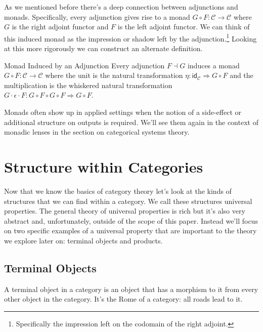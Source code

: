 \documentclass[12pt]{article}
\newcounter{examp}
\begin{document}
As we mentioned before there's a deep connection between adjunctions and monads.
Specifically, every adjunction gives rise to a monad $G \circ F: \mathcal{C} \rightarrow \mathcal{C}$ where $G$ is the right adjoint functor and $F$ is the left adjoint functor.
We can think of this induced monad as the impression or shadow left by the adjunction.\footnote{Specifically the impression left on the codomain of the right adjoint.}
Looking at this more rigorously we can construct an alternate definition.
\begin{definition}{Monad Induced by an Adjunction}{}
    Every adjunction $F \dashv G$ induces a monad $G \circ F: \mathcal{C} \rightarrow \mathcal{C}$ where the unit is the natural transformation $\eta : \mathsf{id}_\mathcal{C} \Rightarrow G \circ F$ and the multiplication is the whiskered natural transformation $G \cdot \epsilon \cdot F: G \circ F \circ G \circ F \Rightarrow G \circ F$.
\end{definition}

Monads often show up in applied settings when the notion of a side-effect or additional structure on outputs is required.
We'll see them again in the context of monadic lenses in the section on categorical systems theory.











\section*{Structure within Categories}

Now that we know the basics of category theory let's look at the kinds of structures that we can find within a category.
We call these structures universal properties.
The general theory of universal properties is rich but it's also very abstract and, unfortunately, outside of the scope of this paper.
Instead we'll focus on two specific examples of a universal property that are important to the theory we explore later on: terminal objects and products.

\subsection*{Terminal Objects}
A terminal object in a category is an object that has a morphism to it from every other object in the category.
It's the Rome of a category: all roads lead to it.
\end{document}
